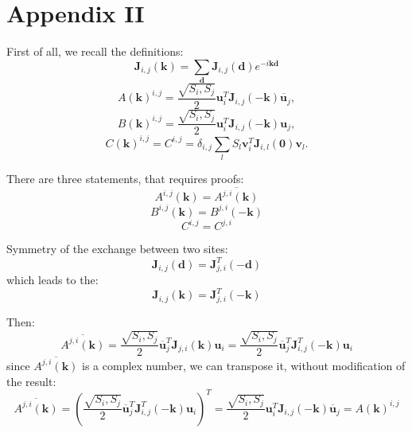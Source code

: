 \section{Appendix II}

First of all, we recall the definitions:
\begin{equation}
    \boldsymbol{J}_{i,j}(\boldsymbol{k}) = \sum_{\boldsymbol{d}}\boldsymbol{J}_{i,j}(\boldsymbol{d})e^{-i\boldsymbol{k}\boldsymbol{d}}
\end{equation}
\begin{equation}
    A(\boldsymbol{k})^{i,j} = \dfrac{\sqrt{S_i, S_j}}{2}\boldsymbol{u}^T_i\boldsymbol{J}_{i,j}(-\boldsymbol{k})\overline{\boldsymbol{u}}_j,
\end{equation}
\begin{equation}
    B(\boldsymbol{k})^{i,j} = \dfrac{\sqrt{S_i, S_j}}{2}\boldsymbol{u}^T_i\boldsymbol{J}_{i,j}(-\boldsymbol{k})\boldsymbol{u}_j,
\end{equation}
\begin{equation}
    C(\boldsymbol{k})^{i,j} = C^{i,j} = \delta_{i,j}\sum_{l}S_l \boldsymbol{v}^T_i\boldsymbol{J}_{i, l}(\boldsymbol{0})\boldsymbol{v}_l.
\end{equation}

There are three statements, that requires proofs:
\begin{equation}
    A^{i,j}(\boldsymbol{k}) = \overline{A^{j,i}(\boldsymbol{k})}
\end{equation}
\begin{equation}
    B^{i,j}(\boldsymbol{k}) = B^{j,i}(-\boldsymbol{k})
\end{equation}
\begin{equation}
    C^{i,j} = C^{j,i}
\end{equation}

Symmetry of the exchange between two sites:
\begin{equation}
    \boldsymbol{J}_{i,j}(\boldsymbol{d}) = \boldsymbol{J}_{j,i}^T(-\boldsymbol{d})
\end{equation}
which leads to the:
\begin{equation}
    \boldsymbol{J}_{i,j}(\boldsymbol{k}) = \boldsymbol{J}_{j,i}^T(-\boldsymbol{k})
\end{equation}

Then:
\begin{equation}
    \overline{A^{j,i}(\boldsymbol{k})} = \dfrac{\sqrt{S_i, S_j}}{2}\overline{\boldsymbol{u}}^T_j\boldsymbol{J}_{j,i}(\boldsymbol{k})\boldsymbol{u}_i = 
    \dfrac{\sqrt{S_i, S_j}}{2}\overline{\boldsymbol{u}}^T_j\boldsymbol{J}_{i,j}^T(-\boldsymbol{k})\boldsymbol{u}_i
\end{equation}
since $\overline{A^{j,i}(\boldsymbol{k})}$ is a complex number, we can transpose it, without modification of the result:
\begin{equation}
    \overline{A^{j,i}(\boldsymbol{k})} =  (\dfrac{\sqrt{S_i, S_j}}{2}\overline{\boldsymbol{u}}^T_j\boldsymbol{J}_{i,j}^T(-\boldsymbol{k})\boldsymbol{u}_i)^T =
    \dfrac{\sqrt{S_i, S_j}}{2}\boldsymbol{u}^T_i\boldsymbol{J}_{i,j}(-\boldsymbol{k})\overline{\boldsymbol{u}}_j = A(\boldsymbol{k})^{i,j}
\end{equation}

